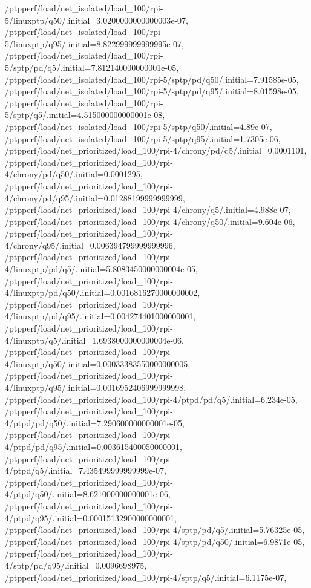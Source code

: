 {    /ptpperf/load/net_isolated/load_100/rpi-5/linuxptp/q50/.initial=3.0200000000000003e-07,
    /ptpperf/load/net_isolated/load_100/rpi-5/linuxptp/q95/.initial=8.822999999999995e-07,
    /ptpperf/load/net_isolated/load_100/rpi-5/sptp/pd/q5/.initial=7.812140000000001e-05,
    /ptpperf/load/net_isolated/load_100/rpi-5/sptp/pd/q50/.initial=7.91585e-05,
    /ptpperf/load/net_isolated/load_100/rpi-5/sptp/pd/q95/.initial=8.01598e-05,
    /ptpperf/load/net_isolated/load_100/rpi-5/sptp/q5/.initial=4.515000000000001e-08,
    /ptpperf/load/net_isolated/load_100/rpi-5/sptp/q50/.initial=4.89e-07,
    /ptpperf/load/net_isolated/load_100/rpi-5/sptp/q95/.initial=1.7305e-06,
    /ptpperf/load/net_prioritized/load_100/rpi-4/chrony/pd/q5/.initial=0.0001101,
    /ptpperf/load/net_prioritized/load_100/rpi-4/chrony/pd/q50/.initial=0.0001295,
    /ptpperf/load/net_prioritized/load_100/rpi-4/chrony/pd/q95/.initial=0.01288199999999999,
    /ptpperf/load/net_prioritized/load_100/rpi-4/chrony/q5/.initial=4.988e-07,
    /ptpperf/load/net_prioritized/load_100/rpi-4/chrony/q50/.initial=9.604e-06,
    /ptpperf/load/net_prioritized/load_100/rpi-4/chrony/q95/.initial=0.006394799999999996,
    /ptpperf/load/net_prioritized/load_100/rpi-4/linuxptp/pd/q5/.initial=5.8083450000000004e-05,
    /ptpperf/load/net_prioritized/load_100/rpi-4/linuxptp/pd/q50/.initial=0.0016816270000000002,
    /ptpperf/load/net_prioritized/load_100/rpi-4/linuxptp/pd/q95/.initial=0.004274401000000001,
    /ptpperf/load/net_prioritized/load_100/rpi-4/linuxptp/q5/.initial=1.6938000000000004e-06,
    /ptpperf/load/net_prioritized/load_100/rpi-4/linuxptp/q50/.initial=0.00033383550000000005,
    /ptpperf/load/net_prioritized/load_100/rpi-4/linuxptp/q95/.initial=0.0016952406999999998,
    /ptpperf/load/net_prioritized/load_100/rpi-4/ptpd/pd/q5/.initial=6.234e-05,
    /ptpperf/load/net_prioritized/load_100/rpi-4/ptpd/pd/q50/.initial=7.290600000000001e-05,
    /ptpperf/load/net_prioritized/load_100/rpi-4/ptpd/pd/q95/.initial=0.003615400050000001,
    /ptpperf/load/net_prioritized/load_100/rpi-4/ptpd/q5/.initial=7.435499999999999e-07,
    /ptpperf/load/net_prioritized/load_100/rpi-4/ptpd/q50/.initial=8.621000000000001e-06,
    /ptpperf/load/net_prioritized/load_100/rpi-4/ptpd/q95/.initial=0.00015132900000000001,
    /ptpperf/load/net_prioritized/load_100/rpi-4/sptp/pd/q5/.initial=5.76325e-05,
    /ptpperf/load/net_prioritized/load_100/rpi-4/sptp/pd/q50/.initial=6.9871e-05,
    /ptpperf/load/net_prioritized/load_100/rpi-4/sptp/pd/q95/.initial=0.0096698975,
    /ptpperf/load/net_prioritized/load_100/rpi-4/sptp/q5/.initial=6.1175e-07,
}
